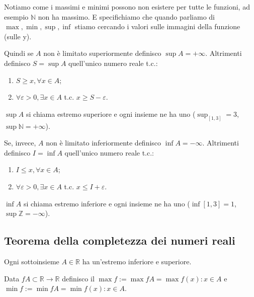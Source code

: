 Notiamo come i massimi e minimi possono non esistere per tutte le funzioni, ad esempio $\mathbb{N}$ non ha massimo. E specifichiamo che quando parliamo di $\max, \min, \sup, \inf$ stiamo cercando i valori sulle immagini della funzione (sulle y).

Quindi se $A$ non è limitato superiormente definisco $\sup{A}=+\infty$. Altrimenti definisco $S=\sup{A}$ quell'unico numero reale t.c.:
\begin{enumerate}
    \item $S\geq x, \forall x\in A$;
    \item $\forall\varepsilon>0, \exists x\in A$ t.c. $x\geq S-\varepsilon$.
\end{enumerate}
$\sup{A}$ si chiama estremo superiore e ogni insieme ne ha uno ($\sup_{[1,3]}=3$, $\sup\mathbb{N}=+\infty$).

Se, invece, $A$ non è limitato inferiormente definisco $\inf{A}=-\infty$. Altrimenti definisco $I=\inf{A}$ quell'unico numero reale t.c.:
\begin{enumerate}
    \item $I\leq x, \forall x\in A$;
    \item $\forall\varepsilon>0, \exists x\in A$ t.c. $x\leq I+\varepsilon$.
\end{enumerate}
$\inf{A}$ si chiama estremo inferiore e ogni insieme ne ha uno ($\inf{[1,3]}=1$, $\sup\mathbb{Z}=-\infty$).

\subsection*{Teorema della completezza dei numeri reali}
Ogni sottoinsieme $A\in\mathbb{R}$ ha un'estremo inferiore e superiore.
\begin{definition}
    Data $fA\subset\mathbb{R}\to\mathbb{R}$ definisco il $\max{f}:=\max f{A}=\max{f(x):x\in A}$ e $\min{f}:=\min f{A}=\min{f(x):x\in A}$.
\end{definition}

\begin{center}
\end{center}

